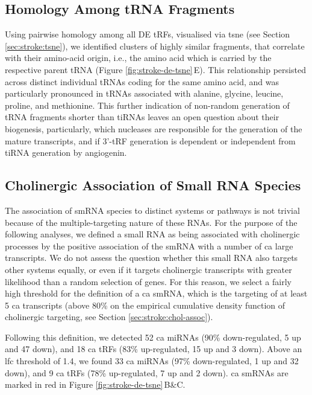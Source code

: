 \subsection{Homology Among tRNA Fragments}
Using pairwise homology among all DE tRFs, visualised via \ac{tsne} (see Section \ref{sec:stroke:tsne}), we identified clusters of highly similar fragments, that correlate with their amino-acid origin, i.e., the amino acid which is carried by the respective parent tRNA (Figure \ref{fig:stroke-de-tsne}\,E). This relationship persisted across distinct individual tRNAs coding for the same amino acid, and was particularly pronounced in tRNAs associated with alanine, glycine, leucine, proline, and methionine. This further indication of non-random generation of tRNA fragments shorter than tiRNAs leaves an open question about their biogenesis, particularly, which nucleases are responsible for the generation of the mature transcripts, and if 3'-tRF generation is dependent or independent from tiRNA generation by angiogenin.

\subsection{Cholinergic Association of Small RNA Species}
The association of smRNA species to distinct systems or pathways is not trivial because of the multiple-targeting nature of these RNAs. For the purpose of the following analyses, we defined a small RNA as being associated with cholinergic processes by the positive association of the smRNA with a number of \acf{ca} large transcripts. We do not assess the question whether this small RNA also targets other systems equally, or even if it targets cholinergic transcripts with greater likelihood than a random selection of genes. For this reason, we select a fairly high threshold for the definition of a \ac{ca} smRNA, which is the targeting of at least 5 \ac{ca} transcripts (above 80\% on the empirical cumulative density function of cholinergic targeting, see Section \ref{sec:stroke:chol-assoc}).

Following this definition, we detected 52 \ac{ca} miRNAs (90\% down-regulated, 5 up and 47 down), and 18 \ac{ca} tRFs (83\% up-regulated, 15 up and 3 down). Above an \ac{lfc} threshold of 1.4, we found 33 \ac{ca} miRNAs (97\% down-regulated, 1 up and 32 down), and 9 \ac{ca} tRFs (78\% up-regulated, 7 up and 2 down). \ac{ca} smRNAs are marked in red in Figure \ref{fig:stroke-de-tsne}\,B\&C.

\newpage

